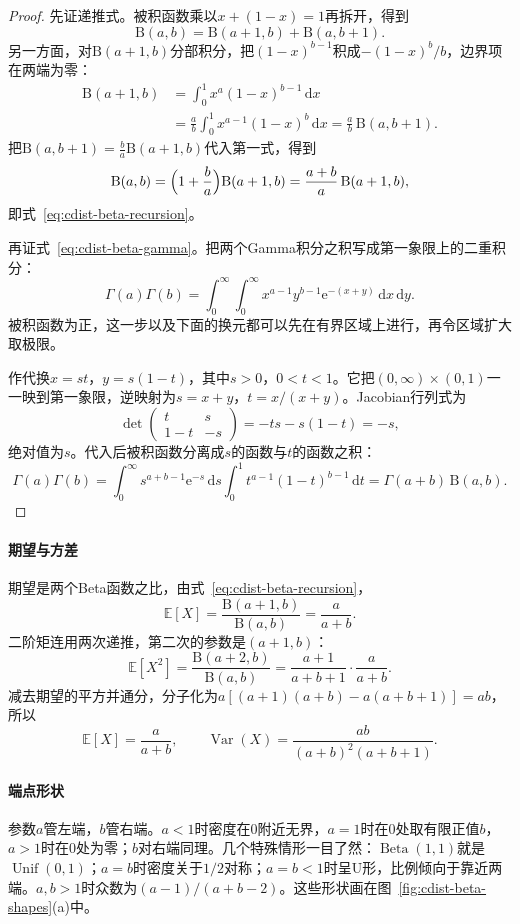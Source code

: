 \begin{proof}
先证递推式。被积函数乘以$x+(1-x)=1$再拆开，得到
\[
  \mathrm{B}(a,b)=\mathrm{B}(a+1,b)+\mathrm{B}(a,b+1).
\]
另一方面，对$\mathrm{B}(a+1,b)$分部积分，把$(1-x)^{b-1}$积成$-(1-x)^{b}/b$，边界项在两端为零：
\[
  \begin{aligned}
  \mathrm{B}(a+1,b)&=\int_0^{1}x^{a}(1-x)^{b-1}\,\mathrm{d}x\\
  &=\frac{a}{b}\int_0^{1}x^{a-1}(1-x)^{b}\,\mathrm{d}x=\frac{a}{b}\,\mathrm{B}(a,b+1).
  \end{aligned}
\]
把$\mathrm{B}(a,b+1)=\frac{b}{a}\mathrm{B}(a+1,b)$代入第一式，得到
\[
  \mathrm{B}(a,b)=\Bigl(1+\frac{b}{a}\Bigr)\mathrm{B}(a+1,b)=\frac{a+b}{a}\,\mathrm{B}(a+1,b),
\]
即式~\eqref{eq:cdist-beta-recursion}。

再证式~\eqref{eq:cdist-beta-gamma}。把两个Gamma积分之积写成第一象限上的二重积分：
\[
  \Gamma(a)\Gamma(b)=\int_0^{\infty}\!\!\int_0^{\infty}x^{a-1}y^{b-1}\mathrm{e}^{-(x+y)}\,\mathrm{d}x\,\mathrm{d}y .
\]
被积函数为正，这一步以及下面的换元都可以先在有界区域上进行，再令区域扩大取极限。

作代换$x=st$，$y=s(1-t)$，其中$s>0$，$0<t<1$。它把$(0,\infty)\times(0,1)$一一映到第一象限，逆映射为$s=x+y$，$t=x/(x+y)$。Jacobian行列式为
\[
  \det\begin{pmatrix}t & s\\ 1-t & -s\end{pmatrix}=-ts-s(1-t)=-s,
\]
绝对值为$s$。代入后被积函数分离成$s$的函数与$t$的函数之积：
\[
  \Gamma(a)\Gamma(b)=\int_0^{\infty}s^{a+b-1}\mathrm{e}^{-s}\,\mathrm{d}s\int_0^{1}t^{a-1}(1-t)^{b-1}\,\mathrm{d}t
  =\Gamma(a+b)\,\mathrm{B}(a,b).
\]
\end{proof}

\paragraph{期望与方差}
期望是两个Beta函数之比，由式~\eqref{eq:cdist-beta-recursion}，
\[
  \mathbb{E}[X]=\frac{\mathrm{B}(a+1,b)}{\mathrm{B}(a,b)}=\frac{a}{a+b}.
\]
二阶矩连用两次递推，第二次的参数是$(a+1,b)$：
\[
  \mathbb{E}[X^{2}]=\frac{\mathrm{B}(a+2,b)}{\mathrm{B}(a,b)}=\frac{a+1}{a+b+1}\cdot\frac{a}{a+b}.
\]
减去期望的平方并通分，分子化为$a[(a+1)(a+b)-a(a+b+1)]=ab$，所以
\begin{equation}
  \mathbb{E}[X]=\frac{a}{a+b},\qquad \operatorname{Var}(X)=\frac{ab}{(a+b)^{2}(a+b+1)} .
  \label{eq:cdist-beta-moments}
\end{equation}

\paragraph{端点形状}
参数$a$管左端，$b$管右端。$a<1$时密度在$0$附近无界，$a=1$时在$0$处取有限正值$b$，$a>1$时在$0$处为零；$b$对右端同理。几个特殊情形一目了然：$\operatorname{Beta}(1,1)$就是$\operatorname{Unif}(0,1)$；$a=b$时密度关于$1/2$对称；$a=b<1$时呈U形，比例倾向于靠近两端。$a,b>1$时众数为$(a-1)/(a+b-2)$。这些形状画在图~\ref{fig:cdist-beta-shapes}(a)中。

